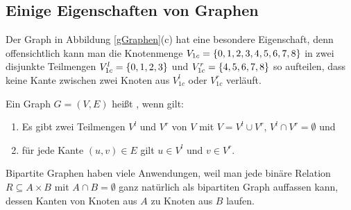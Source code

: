 \subsection{Einige Eigenschaften von Graphen}
Der Graph in Abbildung \ref{gGraphen}(c) hat eine besondere
Eigenschaft, denn offensichtlich kann man die Knotenmenge $V_{1c}
= \{0,1,2,3,4,5,6,7,8\}$ in zwei disjunkte Teilmengen $V_{1c}^l
= \{0,1,2,3\}$ und $V_{1c}^r = \{4,5,6,7,8\}$ so aufteilen, dass
keine Kante zwischen zwei Knoten aus $V_{1c}^l$ oder $V_{1c}^r$
verläuft.

\begin{definition}
Ein Graph $G = (V,E)$ heißt , wenn gilt:
\begin{enumerate}
%
\item Es gibt zwei Teilmengen $V^l$ und $V^r$ von $V$ mit $V =
V^l \cup V^r$, $V^l \cap V^r = \emptyset$ und 
%
\item für jede Kante $(u,v) \in E$ gilt $u \in V^l$ und $v \in V^r$.
%
\end{enumerate}
\end{definition}

Bipartite Graphen haben viele Anwendungen, weil man jede binäre
Relation $R \subseteq A \times B$ mit $A \cap B = \emptyset$ ganz
natürlich als bipartiten Graph auffassen kann, dessen Kanten von
Knoten aus $A$ zu Knoten aus $B$ laufen.

